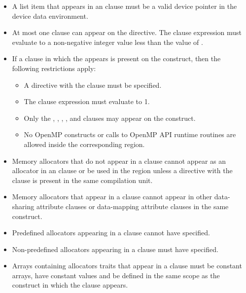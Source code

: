 \begin{itemize}
\item A list item that appears in an  clause must be a valid device pointer in the device data environment.

\item At most one  clause can appear on the directive.  The
     clause expression 
must evaluate to a non-negative integer value less than the value of .

\item If a  clause in which the   appears is present
    on the construct, then the following restrictions apply:
\begin{itemize}
   \item A  directive with the 
       clause must be specified.
   \item The  clause expression must evaluate to 1.
   \item Only the , , ,
       , and  clauses may appear on the construct.
   \item No OpenMP constructs or calls to OpenMP API runtime routines are allowed
       inside the corresponding  region.
\end{itemize}

\item Memory allocators that do not appear in a  clause cannot appear as an allocator in an  clause or be used in the  region unless a  directive with the  clause is present in the same compilation unit.

\item Memory allocators that appear in a  clause cannot appear in other data-sharing attribute clauses or data-mapping attribute clauses in the same construct.

\item Predefined allocators appearing in a  clause cannot have  specified.

\item Non-predefined allocators appearing in a  clause must have  specified.

\item Arrays containing allocators traits that appear in a  clause must be constant arrays, have constant values and be defined in the same scope as the construct in which the clause appears. 


\end{itemize}
